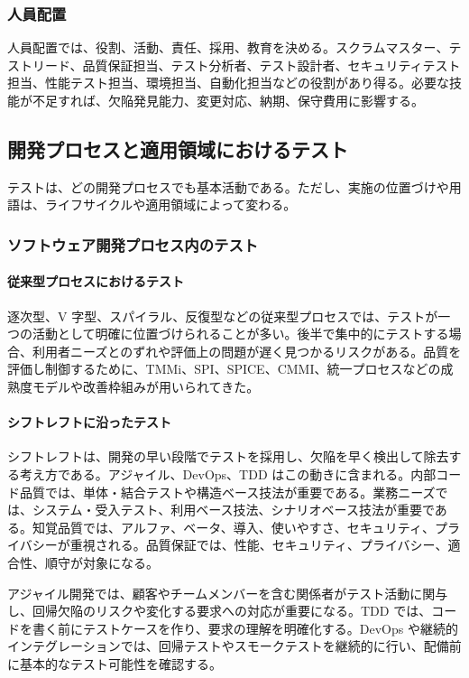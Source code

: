 \documentclass[a4paper,11pt]{ltjsarticle}
\numberwithin{figure}{section}
\numberwithin{table}{section}
\begin{document}
\subsubsection{人員配置}
人員配置では、役割、活動、責任、採用、教育を決める。スクラムマスター、テストリード、品質保証担当、テスト分析者、テスト設計者、セキュリティテスト担当、性能テスト担当、環境担当、自動化担当などの役割があり得る。必要な技能が不足すれば、欠陥発見能力、変更対応、納期、保守費用に影響する。

\subsection{開発プロセスと適用領域におけるテスト}
テストは、どの開発プロセスでも基本活動である。ただし、実施の位置づけや用語は、ライフサイクルや適用領域によって変わる。

\subsubsection{ソフトウェア開発プロセス内のテスト}
\paragraph{従来型プロセスにおけるテスト}
逐次型、V 字型、スパイラル、反復型などの従来型プロセスでは、テストが一つの活動として明確に位置づけられることが多い。後半で集中的にテストする場合、利用者ニーズとのずれや評価上の問題が遅く見つかるリスクがある。品質を評価し制御するために、TMMi、SPI、SPICE、CMMI、統一プロセスなどの成熟度モデルや改善枠組みが用いられてきた。

\paragraph{シフトレフトに沿ったテスト}
シフトレフトは、開発の早い段階でテストを採用し、欠陥を早く検出して除去する考え方である。アジャイル、DevOps、TDD はこの動きに含まれる。内部コード品質では、単体・結合テストや構造ベース技法が重要である。業務ニーズでは、システム・受入テスト、利用ベース技法、シナリオベース技法が重要である。知覚品質では、アルファ、ベータ、導入、使いやすさ、セキュリティ、プライバシーが重視される。品質保証では、性能、セキュリティ、プライバシー、適合性、順守が対象になる。

アジャイル開発では、顧客やチームメンバーを含む関係者がテスト活動に関与し、回帰欠陥のリスクや変化する要求への対応が重要になる。TDD では、コードを書く前にテストケースを作り、要求の理解を明確化する。DevOps や継続的インテグレーションでは、回帰テストやスモークテストを継続的に行い、配備前に基本的なテスト可能性を確認する。
\end{document}
